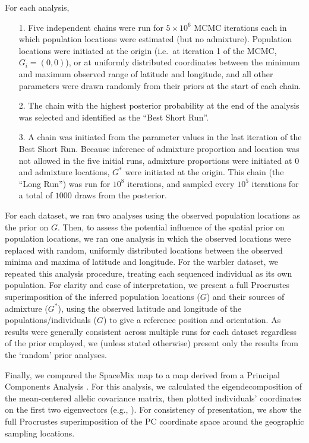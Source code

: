 \documentclass[10pt,letterpaper]{article}
\newcommand{\admixsource}[1]{{$G^{*}$}}
\newcommand{\identifyadmixsource}[1]{{#1^{*}}}
\begin{document}
For each analysis,
\begin{itemize}
\item[1.] Five independent chains were run for $5\times 10^6$ MCMC iterations each in which population locations were estimated (but no admixture).  Population locations were initiated at the origin (i.e.\, at iteration 1 of the MCMC, $G_i = (0,0)$), or at uniformly distributed coordinates between the minimum and maximum observed range of latitude and longitude, and all other parameters were drawn randomly from their priors at the start of each chain.  
\item[2.]The chain with the highest posterior probability at the end of the analysis was selected and identified as the ``Best Short Run''.
\item[3.] A chain was initiated from the parameter values in the last iteration of the Best Short Run.  Because inference of admixture proportion and location was not allowed in the five initial runs, admixture proportions were initiated at 0 and admixture locations, \admixsource{G} were initiated at the origin.  This  chain (the ``Long Run'') was run for $10^8$ iterations, and sampled every $10^5$ iterations for a total of $1000$ draws from the posterior.
\end{itemize}

For each dataset, we ran two analyses using the observed population locations as the prior on $G$.  
Then, to assess the potential influence of the spatial prior on population locations, 
we ran one analysis in which the observed locations
were replaced with random, uniformly distributed locations between the observed minima and maxima of latitude and longitude.
For the warbler dataset, we repeated this analysis procedure, treating each sequenced individual as its own population.  
For clarity and ease of interpretation, we present a full Procrustes superimposition of the inferred population locations ($G$) 
and their sources of admixture ($\identifyadmixsource{G}$), 
using the observed latitude and longitude of the populations/individuals ($G$) to give a reference position and orientation.  
As results were generally consistent across multiple runs for each dataset regardless of the prior employed, 
we (unless stated otherwise) present only the results from the `random' prior analyses.

Finally, we compared the SpaceMix map to a map derived from a Principal Components Analysis \cite{Patterson2006}.  For this analysis, we calculated the eigendecomposition of the mean-centered allelic covariance matrix, then plotted individuals' coordinates on the first two eigenvectors (e.g., \cite{novembre_genes_2008}).  For consistency of presentation, we show the full Procrustes superimposition of the PC coordinate space around the geographic sampling locations.
\end{document}
